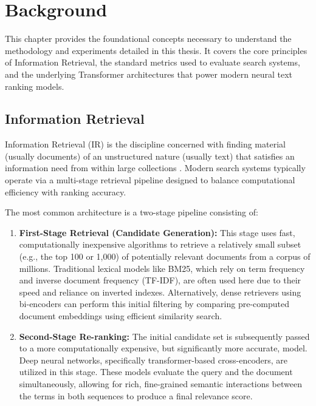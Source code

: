 \chapter{Background}
\label{ch:background}

This chapter provides the foundational concepts necessary to understand the methodology and experiments detailed in this thesis. It covers the core principles of Information Retrieval, the standard metrics used to evaluate search systems, and the underlying Transformer architectures that power modern neural text ranking models.

\section{Information Retrieval}
\label{sec:background_ir}

Information Retrieval (IR) is the discipline concerned with finding material (usually documents) of an unstructured nature (usually text) that satisfies an information need from within large collections \cite{lin2021pretrained}. Modern search systems typically operate via a multi-stage retrieval pipeline designed to balance computational efficiency with ranking accuracy.

The most common architecture is a two-stage pipeline consisting of:
\begin{enumerate}
    \item \textbf{First-Stage Retrieval (Candidate Generation):} This stage uses fast, computationally inexpensive algorithms to retrieve a relatively small subset (e.g., the top 100 or 1,000) of potentially relevant documents from a corpus of millions. Traditional lexical models like BM25, which rely on term frequency and inverse document frequency (TF-IDF), are often used here due to their speed and reliance on inverted indexes. Alternatively, dense retrievers using bi-encoders can perform this initial filtering by comparing pre-computed document embeddings using efficient similarity search.
    \item \textbf{Second-Stage Re-ranking:} The initial candidate set is subsequently passed to a more computationally expensive, but significantly more accurate, model. Deep neural networks, specifically transformer-based cross-encoders, are utilized in this stage. These models evaluate the query and the document simultaneously, allowing for rich, fine-grained semantic interactions between the terms in both sequences to produce a final relevance score.
\end{enumerate}

